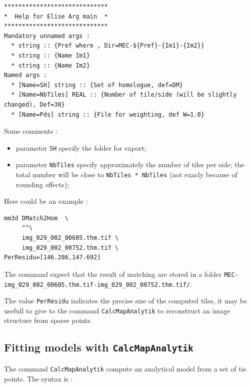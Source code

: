 \begin{verbatim}
*****************************
*  Help for Elise Arg main  *
*****************************
Mandatory unnamed args : 
  * string :: {Pref where , Dir=MEC-${Pref}-{Im1}-{Im2}}
  * string :: {Name Im1}
  * string :: {Name Im2}
Named args : 
  * [Name=SH] string :: {Set of homologue, def=DM}
  * [Name=NbTiles] REAL :: {Number of tile/side (will be slightly changed), Def=30}
  * [Name=Pds] string :: {File for weighting, def W=1.0}
\end{verbatim}

Some comments :

\begin{itemize}
   \item parameter {\tt SH} specify the folder  for export;
   \item parameter {\tt NbTiles} specify approximately the number of tiles per side;
         the total number will be close to {\tt NbTiles * NbTiles} (not exacly because of rounding effects);
\end{itemize}

Here could be an example :

\begin{verbatim}
mm3d DMatch2Hom  \
     ""\
     img_029_002_00605.thm.tif \
     img_029_002_00752.thm.tif \
PerResidu=[146.286,147.692]
\end{verbatim}

The command expect that the result of matching are stored in a folder 
{\tt MEC-img\_029\_002\_00605.thm.tif-img\_029\_002\_00752.thm.tif/}.

The value {\tt PerResidu} indicates the precise size of the computed tiles,
it may be usefull to give to the command {\tt CalcMapAnalytik} to reconstruct
an image structure from sparse points.


\subsection{Fitting models with {\tt CalcMapAnalytik}}

\label{CalcMapAnalytik}


The command {\tt CalcMapAnalytik} compute an analytical model from a set
of tie points.  The syntax is :

